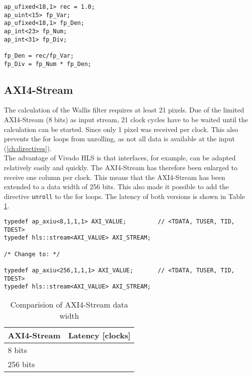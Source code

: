 \begin{minipage}{\textwidth}
\begin{lstlisting}[style=CStyle, caption=Calculation of the division for the Wallis filter, label=lst:division]
ap_ufixed<18,1> rec = 1.0;
ap_uint<15> fp_Var;
ap_ufixed<18,1> fp_Den;
ap_int<23> fp_Num;
ap_int<31> fp_Div;

fp_Den = rec/fp_Var;
fp_Div = fp_Num * fp_Den;
\end{lstlisting}
\end{minipage}


\subsection{AXI4-Stream}
The calculation of the Wallis filter requires at least 21 pixels. Due of the limited AXI4-Stream (8 bits) as input stream, 21 clock cycles have to be waited until the calculation can be started. Since only 1 pixel was received per clock. This also prevents the for loops from unrolling, as not all data is available at the input (\ref{ch:directives}). \\
The advantage of Vivado HLS is that interfaces, for example, can be adapted relatively easily and quickly. The AXI4-Stream has therefore been enlarged to receive one column per clock. This means that the AXI4-Stream has been extended to a data width of 256 bits. This also made it possible to add the directive \texttt{unroll} to the for loops. The latency of both versions is shown in Table \ref{tab:axi4}.

\begin{minipage}{\textwidth}
\begin{lstlisting}[style=CStyle, caption=Calculation of the division for the Wallis filter, label=lst:division]
typedef ap_axiu<8,1,1,1> AXI_VALUE;			// <TDATA, TUSER, TID, TDEST>
typedef hls::stream<AXI_VALUE> AXI_STREAM;

/* Change to: */

typedef ap_axiu<256,1,1,1> AXI_VALUE;		// <TDATA, TUSER, TID, TDEST>
typedef hls::stream<AXI_VALUE> AXI_STREAM;
\end{lstlisting}
\end{minipage}

\begin{table}[tb!]
    \centering
    \begin{tabular}{l c}
        \toprule
        AXI4-Stream & Latency [clocks]  \\
        \midrule
        8 bits & 
        \\
        256 bits &  
        \\
        \bottomrule
    \end{tabular}
    \caption{Comparision of AXI4-Stream data width}
    \label{tab:axi4}
\end{table}

